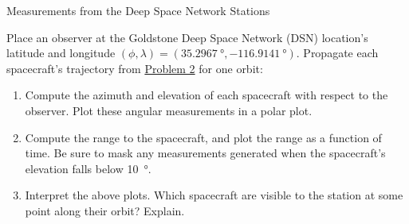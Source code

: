 \begin{hwkProblem}{4}{Measurements from the Deep Space Network Stations} \label{hwk:p04}

	Place an observer at the Goldstone Deep Space Network (DSN) location's latitude and longitude \( \left(\phi, \lambda\right)= \left(\qty{35.2967}{\degree},\qty{-116.9141}{\degree}\right) \). Propagate each spacecraft's trajectory from \hyperref[hwk:p02]{Problem 2} for one orbit:
	\begin{enumerate}[label=(\alph*)]
		\item \label{hwk:p04a} Compute the azimuth and elevation of each spacecraft with respect to the observer. Plot these angular measurements in a polar plot.
		\item \label{hwk:p04b} Compute the range to the spacecraft, and plot the range as a function of time. Be sure to mask any measurements generated when the spacecraft's elevation falls below \qty{10}{\degree}.
		\item \label{hwk:p04c} Interpret the above plots. Which spacecraft are visible to the station at some point along their orbit? Explain.
	\end{enumerate}

	\hwkSol{} \label{hwk:s04}

	\hwkPart{} \label{hwk:s04a}


\end{hwkProblem}
